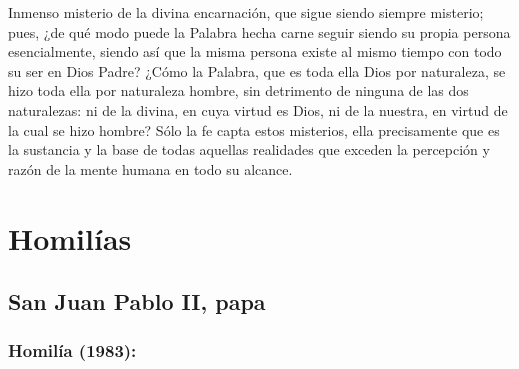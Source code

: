 \begin{body}
				Inmenso misterio de la divina encarnación, que sigue siendo siempre misterio; pues, ¿de qué modo puede la Palabra hecha carne seguir siendo su propia persona esencialmente, siendo así que la misma persona existe al mismo tiempo con todo su ser en Dios Padre? ¿Cómo la Palabra, que es toda ella Dios por naturaleza, se hizo toda ella por naturaleza hombre, sin detrimento de ninguna de las dos naturalezas: ni de la divina, en cuya virtud es Dios, ni de la nuestra, en virtud de la cual se hizo hombre? Sólo la fe capta estos misterios, ella precisamente que es la sustancia y la base de todas aquellas realidades que exceden la percepción y razón de la mente humana en todo su alcance.
			\end{body}


\newsection


	\section{Homilías}
	
		
		\subsection{San Juan Pablo II, papa}
		
			\subsubsection{Homilía (1983):}
			
				
				
